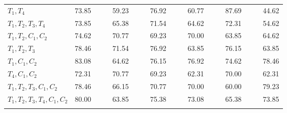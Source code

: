 \begin{table}
{\begin{tabularx}{1.01\textwidth}{@{}l	lllr	 ll	lllr	 ll	lllr@{}}
	$T_1,T_4$ 					& 73.85 & & & 59.23 & & & 76.92 & & & 60.77 & & & 87.69 & & & 44.62 \\
	$T_1,T_2,T_3,T_4$ 			& 73.85 & & & 65.38 & & & 71.54 & & & 64.62 & & & 72.31 & & & 54.62 \\
	$T_1,T_2,C_1,C_2$ 			& 74.62 & & & 70.77 & & & 69.23 & & & 70.00 & & & 63.85 & & & 64.62 \\
	$T_1,T_2,T_3$ 				& 78.46 & & & 71.54 & & & 76.92 & & & 63.85 & & & 76.15 & & & 63.85 \\
  	$T_1,C_1,C_2$ 				& \cellcolor[gray]{0.8}83.08 &\cellcolor[gray]{0.8} &\cellcolor[gray]{0.8} & \cellcolor[gray]{0.8}64.62 & & & 76.15 & & & 76.92 & & & 74.62 & & & 78.46 \\ 
 	$T_4,C_1,C_2$ 				& 72.31 & & & 70.77 & & & 69.23 & & & 62.31 & & & 70.00 & & & 62.31 \\
 	$T_1,T_2,T_3,C_1,C_2$ 		& 78.46 & & & 66.15 & & & 70.77 & & & 70.00 & & & 60.00 & & & 79.23 \\
 	$T_1,T_2,T_3,T_4,C_1,C_2$ 	& 80.00 & & & 63.85 & & & 75.38 & & & 73.08 & & & 65.38 & & & 73.85\\ 	
 	\multicolumn{17}{l}{}\\
 	\bottomrule
  \end{tabularx}  
	}
\end{table}
